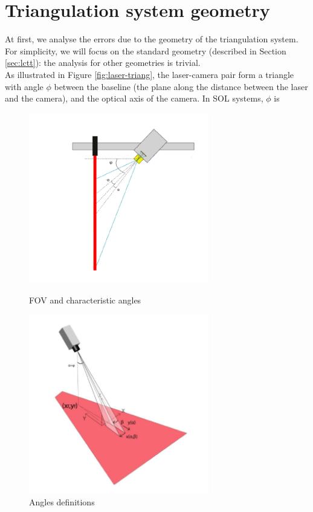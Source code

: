 \section{Triangulation system geometry}
\label{sec:init-modelanalysis}
At first, we analyse the errors due to the geometry of the triangulation system. For simplicity, we will focus on the standard geometry (described in Section \ref{sec:lctt}): the analysis for other geometries is trivial. \\

As illustrated in Figure \ref{fig:laser-triang}, the laser-camera pair form a triangle with angle $\phi$ between the baseline (the plane along the distance between the laser and the camera), and the optical axis of the camera. In \acs{SOL} systems, $\phi$ is
\clearpage
  \begin{figure}[h]
    \centering
    \begin{minipage}[c]{\textwidth}
      \centering
      \includegraphics[width=0.7\textwidth]{./images/model/laser_triang.png}
      \caption{\acs{FOV} and characteristic angles}
      \label{fig:laser-triang}
    \end{minipage}
    \vfill
    \begin{minipage}[c]{\textwidth}
      \centering
      \includegraphics[width=0.7\textwidth]{./images/model/laser_triang_pdv.png}
      \caption{Angles definitions}
      \label{fig:laser-triang-pdv}
    \end{minipage}
  \end{figure}
